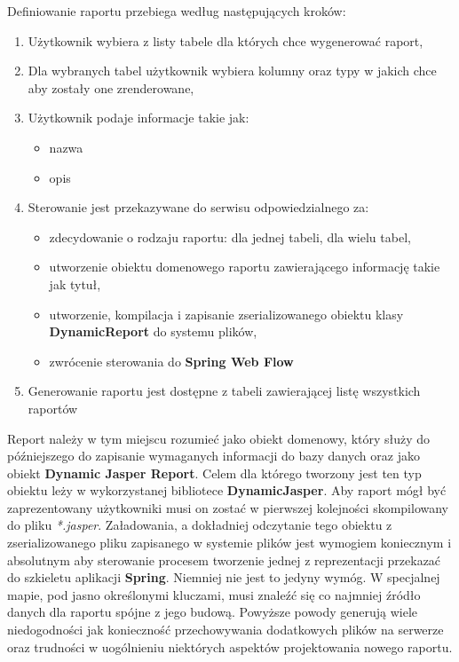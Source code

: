 			Definiowanie raportu przebiega według następujących kroków:
			\begin{enumerate}
				\item Użytkownik wybiera z listy tabele dla których chce wygenerować raport,
				\item Dla wybranych tabel użytkownik wybiera kolumny oraz typy w jakich chce aby zostały one zrenderowane,
				\item Użytkownik podaje informacje takie jak:
				\begin{itemize}
					\item nazwa
					\item opis
				\end{itemize}
				\item Sterowanie jest przekazywane do serwisu odpowiedzialnego za:
				\begin{itemize}
					\item zdecydowanie o rodzaju raportu: dla jednej tabeli, dla wielu tabel,
					\item utworzenie obiektu domenowego raportu zawierającego informację takie jak tytuł,
					\item utworzenie, kompilacja i zapisanie zserializowanego obiektu klasy \textbf{DynamicReport} do systemu plików,
					\item zwrócenie sterowania do \textbf{Spring Web Flow}
				\end{itemize}
				\item Generowanie raportu jest dostępne z tabeli zawierającej listę wszystkich raportów
			\end{enumerate}
			Report należy w tym miejscu rozumieć jako obiekt domenowy, który służy do późniejszego do zapisanie
			wymaganych informacji do bazy danych oraz jako obiekt \textbf{Dynamic Jasper Report}. Celem dla którego
			tworzony jest ten typ obiektu leży w wykorzystanej bibliotece \textbf{DynamicJasper}. 
			Aby raport mógł być zaprezentowany użytkowniki musi on zostać w pierwszej kolejności
			skompilowany do pliku \textit{*.jasper}. Załadowania, a dokładniej odczytanie tego obiektu z zserializowanego
			pliku zapisanego w systemie plików jest wymogiem koniecznym i absolutnym aby sterowanie procesem
			tworzenie jednej z reprezentacji przekazać do szkieletu aplikacji \textbf{Spring}. Niemniej nie jest to jedyny
			wymóg. W specjalnej mapie, pod jasno określonymi kluczami, musi znaleźć się co najmniej źródło danych dla raportu spójne z jego budową.
			Powyższe powody generują wiele niedogodności jak konieczność przechowywania dodatkowych plików na serwerze oraz
			trudności w uogólnieniu niektórych aspektów projektowania nowego raportu.
			
